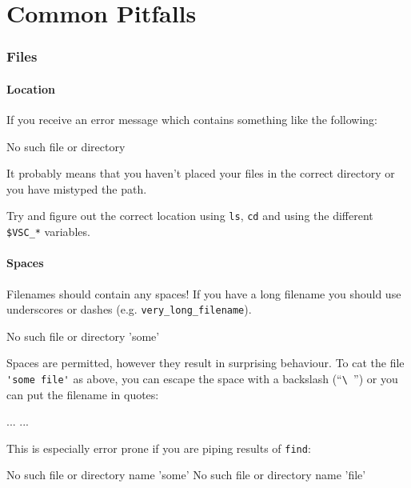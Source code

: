 \chapter{Common Pitfalls}

\subsection{Files}

\subsubsection{Location}
If you receive an error message which contains something like the following:

\begin{prompt}
No such file or directory
\end{prompt}

It probably means that you haven't placed your files in the correct directory or you have mistyped the path.

Try and figure out the correct location using \verb|ls|, \verb|cd| and using the
different \verb|$VSC_*| variables.

\subsubsection{Spaces}

Filenames should  contain any spaces! If you have a long filename
you should use underscores or dashes (e.g. \verb|very_long_filename|).

\begin{prompt}
No such file or directory 'some'
\end{prompt}

Spaces are permitted, however they result in surprising behaviour. To cat the
file \verb|'some file'| as above, you can escape the space with a backslash (``\verb|\ |'')
or you can put the filename in quotes:

\begin{prompt}
...
...
\end{prompt}

This is especially error prone if you are piping results of \verb|find|:

\begin{prompt}
No such file or directory name 'some'
No such file or directory name 'file'
\end{prompt}

